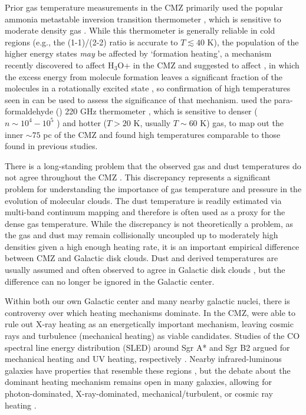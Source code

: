 Prior gas temperature measurements in the CMZ primarily used the popular
ammonia metastable inversion transition thermometer \citep[\ammonia (1,1) -
(7,7);][]{Guesten1981a,Huettemeister1993a,Ott2014a,Mauersberger1986a}, which is
sensitive to moderate density gas \citep[$n(\hh) \sim 10^3-10^4$
\percc;][]{Shirley2015a}.  While this thermometer is generally reliable in cold
regions (e.g., the (1-1)/(2-2) ratio is accurate to $T\lesssim40$ K), the
population of the higher energy states \emph{may} be affected by `formation
heating', a mechanism recently discovered to affect H$_3$O+ in the
CMZ and suggested to affect \ammonia, in which the excess energy from molecule
formation leaves a significant fraction of the molecules in a rotationally
excited state \citep[][]{Lis2014a}, so confirmation of high temperatures seen
in \ammonia \citep{Mills2013a} can be used to assess the significance of that
mechanism.  \citet{Ao2013a} used the para-formaldehyde (\para) 220 GHz
thermometer
\citep{Mangum1993a}, which is sensitive to denser ($n\sim10^4-10^5$ \percc) and
hotter ($T>20$ K, usually $T\sim60$ K) gas, to map out the inner $\sim75$ pc of
the CMZ and found high temperatures comparable to those found in previous
studies.

There is a long-standing problem that the observed gas and dust temperatures do
not agree throughout the CMZ
\citep{Guesten1981a,Molinari2011a,Ao2013a,Ott2014a}.  This discrepancy
represents a significant problem for understanding the importance of gas
temperature and pressure in the evolution of molecular clouds.  The dust
temperature is readily estimated via multi-band continuum mapping and therefore
is often used as a proxy for the dense gas temperature.  While the discrepancy
is not
theoretically a problem, as the gas and dust may remain collisionally uncoupled
up to moderately high densities given a high enough heating rate, it is an
important empirical difference between CMZ and Galactic disk clouds.
Dust and \ammonia derived temperatures are usually assumed and often observed
to agree in Galactic disk clouds
\citep{Pillai2006a,Dunham2010a,Juvela2012a,Battersby2014a}, but the difference
can no longer be ignored in the Galactic center.

Within both our own Galactic center and many nearby galactic nuclei, there is
controversy over which heating mechanisms dominate.  In the CMZ,
\citet{Ao2013a} were able to rule out X-ray heating as an energetically
important mechanism, leaving cosmic rays and turbulence (mechanical heating) as
viable candidates.  Studies of the CO spectral line energy distribution (SLED)
around Sgr A* and Sgr B2 argued for mechanical heating and UV heating,
respectively \citep{Goicoechea2013a,Etxaluze2013a}.  Nearby infrared-luminous
galaxies have properties that resemble these regions
\citep{Kamenetzky2012a,Kamenetzky2014a}, but the debate about the dominant
heating mechanism remains open in many galaxies, allowing for photon-dominated,
X-ray-dominated, mechanical/turbulent, or cosmic ray heating
\citep{Loenen2008a,Meijerink2011a,Bayet2011a,Mangum2013a}.

